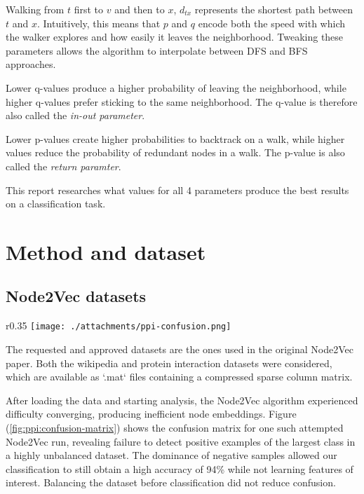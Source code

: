 \documentclass[a4paper,10pt]{article}
\begin{document}
Walking from $t$ first to $v$ and then to $x$, $d_{tx}$ represents the shortest path between $t$ and $x$. Intuitively, this means that $p$ and $q$ encode both the speed with which the walker explores and how easily it leaves the neighborhood. Tweaking these parameters allows the algorithm to interpolate between DFS and BFS approaches.

Lower q-values produce a higher probability of leaving the neighborhood, while higher q-values prefer sticking to the same neighborhood. The q-value is therefore also called the \textit{in-out parameter}.

Lower p-values create higher probabilities to backtrack on a walk, while higher values reduce the probability of redundant nodes in a walk. The p-value is also called the \textit{return paramter}.

This report researches what values for all 4 parameters produce the best results on a classification task.

\section{Method and dataset}

\subsection{Node2Vec datasets}

\begin{wrapfigure}{r}{0.35\textwidth}
  \centering
  \vspace{-8mm}
      \texttt{[image: ./attachments/ppi-confusion.png]}
        \caption{Confusion matrix for PPI dataset}
        \label{fig:ppi:confusion-matrix}
\end{wrapfigure}

The requested and approved datasets are the ones used in the original Node2Vec paper. Both the wikipedia and protein interaction datasets were considered, which are available as `.mat` files containing a compressed sparse column matrix.

After loading the data and starting analysis, the Node2Vec algorithm experienced difficulty converging, producing inefficient node embeddings. Figure (\ref{fig:ppi:confusion-matrix}) shows the confusion matrix for one such attempted Node2Vec run, revealing failure to detect positive examples of the largest class in a highly unbalanced dataset. The dominance of negative samples allowed our classification to still obtain a high accuracy of 94\% while not learning features of interest. Balancing the dataset before classification did not reduce confusion.
\end{document}
